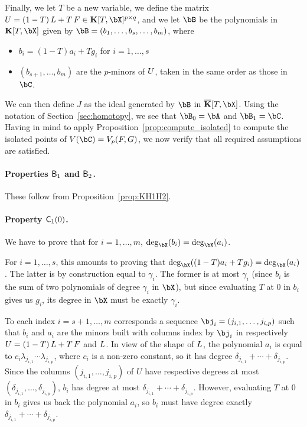 \documentclass[12pt]{article}
\begin{document}
Finally, we let $T$ be a new variable, we define the matrix
$\mU=(1-T)\, \mL + T \, \mF \in \KK[T,\bX]^{p\times q}$, and we let $\bB$ be the polynomials in
$\KK[T,\bX]$ given by $\bB=(b_1,\dots,b_s,\dots,b_m)$, where
\begin{itemize}
\item $b_i=(1-T) a_i + T g_i$ for $i=1,\dots,s$
\item $(b_{s+1},\dots,b_{m})$ are the $p$-minors of ${U}$, taken in
  the same order as those in $\bC$.
\end{itemize}
We can then define $J$ as the ideal generated by $\bB$ in
$\KKbar[T,\bX]$. Using the notation of Section~\ref{sec:homotopy}, we
see that $\bB_0=\bA$ and $\bB_1=\bC$. Having in mind
to apply Proposition~\ref{prop:compute_isolated} to compute the
isolated points of $V(\bC)=\VpFG{p}{\mF}{G}$, we now verify that all
required assumptions are satisfied.

\paragraph{Properties $\mathsf{B}_1$ and $\mathsf{B}_2$.}
These follow from Proposition~\ref{prop:KH1H2}.

\paragraph{Property $\mathsf{C}_1(0)$.} We have to prove that for $i=1,\dots,m$,
$\deg_\bX(b_i)=\deg_\bX(a_i)$. 

For $i=1,\dots,s$, this amounts to proving that $\deg_\bX((1-T) a_i +
T g_i)=\deg_\bX(a_i)$. The latter is by construction equal to
$\gamma_i$. The former is at most $\gamma_i$ (since $b_i$ is the sum
of two polynomials of degree $\gamma_i$ in $\bX$), but since
evaluating $T$ at $0$ in $b_i$ gives us $g_i$, its degree in $\bX$
must be exactly $\gamma_i$.

To each index $i=s+1,\dots,m$ corresponds a sequence
$\bj_i=(j_{i,1},\dots,j_{i,p})$ such that $b_i$ and $a_i$ are the
minors built with columns index by $\bj_i$ in respectively
${U}=(1-T)\, {L} + T \, {F}$ and ${L}$. In view of the shape of ${L}$,
the polynomial $a_i$ is equal to $c_i\lambda_{j_{i,1}}\cdots
\lambda_{j_{i,p}}$, where $c_i$ is a non-zero constant, so it has degree
$\delta_{j_{i,1}} + \cdots + \delta_{j_{i,p}}$.  Since the columns
$(j_{i,1},\dots,j_{i,p})$ of $U$ have respective degrees at most
$(\delta_{j_{i,1}},\dots,\delta_{j_{i,p}})$, $b_i$ has degree at most
$\delta_{j_{i,1}} + \cdots + \delta_{j_{i,p}}$. However, evaluating
$T$ at $0$ in $b_i$ gives us back the polynomial $a_i$, so $b_i$ must
have degree exactly $\delta_{j_{i,1}} + \cdots + \delta_{j_{i,p}}$.
\end{document}

